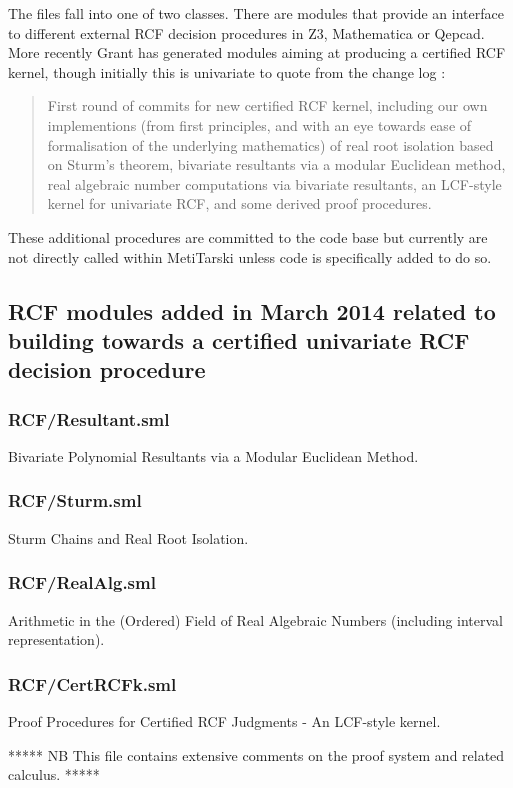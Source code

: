 \documentclass[11pt, oneside]{article}   	%
\begin{document}
The files fall into one of two classes. There  are modules that provide an interface to different external RCF decision procedures in Z3, Mathematica or Qepcad. More recently Grant has generated modules aiming at producing a certified RCF kernel, though initially this is univariate to quote from the change log :
\begin{quote}
First round of commits for new certified
RCF kernel, including our own
implementions (from first principles, and
with an eye towards ease of formalisation
of the underlying mathematics) of real
root isolation based on Sturm's theorem,
bivariate resultants via a modular
Euclidean method, real algebraic number
computations via bivariate resultants, an
LCF-style kernel for univariate RCF, and
some derived proof procedures.
\end{quote}


These additional procedures are committed to the code base but currently are not directly called within MetiTarski unless code is specifically added to do so.

\subsection{RCF modules added in March 2014 related to building towards a certified univariate RCF decision procedure}

\subsubsection{RCF/Resultant.sml}
Bivariate Polynomial Resultants via a Modular Euclidean Method.
\subsubsection{RCF/Sturm.sml}
Sturm Chains and Real Root Isolation.
\subsubsection{RCF/RealAlg.sml}
Arithmetic in the (Ordered) Field of Real Algebraic Numbers (including interval representation).

\subsubsection{RCF/CertRCFk.sml}
 Proof Procedures for Certified RCF Judgments  - An LCF-style kernel.
 
***** NB This file contains extensive comments on the proof system and related calculus. *****
 
\end{document}
